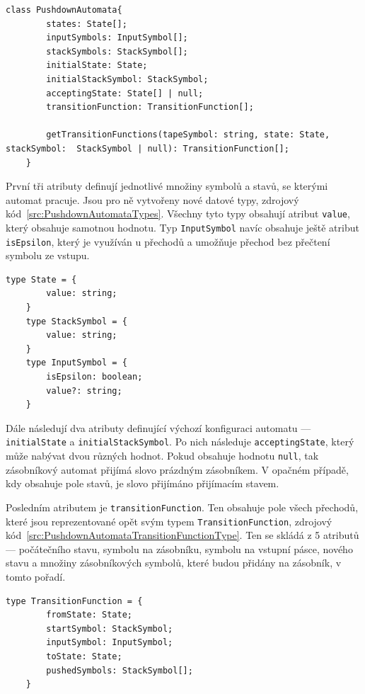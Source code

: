 \begin{lstlisting}[label=src:PushdownAutomataDefinition, caption={Deklarace třídy PushdownAutomata}]
    class PushdownAutomata{
        states: State[];
        inputSymbols: InputSymbol[];
        stackSymbols: StackSymbol[];
        initialState: State;
        initialStackSymbol: StackSymbol;
        acceptingState: State[] | null;
        transitionFunction: TransitionFunction[];

        getTransitionFunctions(tapeSymbol: string, state: State, stackSymbol:  StackSymbol | null): TransitionFunction[];
    }
\end{lstlisting}

První tři atributy definují jednotlivé množiny symbolů a stavů, se kterými automat pracuje. Jsou pro ně vytvořeny nové datové typy, zdrojový kód~\ref{src:PushdownAutomataTypes}. Všechny tyto typy obsahují atribut \texttt{value}, který obsahuje samotnou hodnotu. Typ \texttt{InputSymbol} navíc obsahuje ještě atribut \texttt{isEpsilon}, který je využíván u přechodů a umožňuje přechod bez přečtení symbolu ze vstupu.

\begin{lstlisting}[label=src:PushdownAutomataTypes, caption={Datové typy State, StackSymbol, InputSymbol}]
    type State = {
        value: string;
    }
    type StackSymbol = {
        value: string;
    }
    type InputSymbol = {
        isEpsilon: boolean;
        value?: string;
    }
\end{lstlisting}

Dále následují dva atributy definující výchozí konfiguraci automatu --- \texttt{initialState} a \texttt{initialStackSymbol}. Po nich následuje \texttt{acceptingState}, který může nabývat dvou různých hodnot. Pokud obsahuje hodnotu \texttt{null}, tak zásobníkový automat přijímá slovo prázdným zásobníkem. V opačném případě, kdy obsahuje pole stavů, je slovo přijímáno přijímacím stavem.

Posledním atributem je \texttt{transitionFunction}. Ten obsahuje pole všech přechodů, které jsou reprezentované opět svým typem \texttt{TransitionFunction}, zdrojový kód~\ref{src:PushdownAutomataTransitionFunctionType}. Ten se skládá z 5 atributů --- počátečního stavu, symbolu na zásobníku, symbolu na vstupní pásce, nového stavu a množiny zásobníkových symbolů, které budou přidány na zásobník, v tomto pořadí.

\begin{lstlisting}[label=src:PushdownAutomataTransitionFunctionType, caption={Datový typ TransitionFunction}]
    type TransitionFunction = {
        fromState: State;
        startSymbol: StackSymbol;
        inputSymbol: InputSymbol;
        toState: State;
        pushedSymbols: StackSymbol[];
    }
\end{lstlisting}

